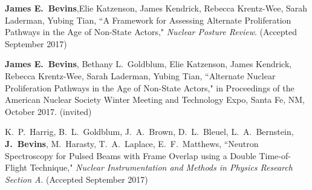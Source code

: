 \begin{bibsection}
  
\item \textbf{James E.\ Bevins},Elie Katzenson, James Kendrick, Rebecca Krentz-Wee, Sarah Laderman, Yubing Tian, ``A Framework for Assessing Alternate Proliferation Pathways in the Age of Non-State Actors," \textit{Nuclear Posture Review}. (Accepted September 2017)

\item \textbf{James E.\ Bevins}, Bethany L.\ Goldblum, Elie Katzenson, James Kendrick, Rebecca Krentz-Wee, Sarah Laderman, Yubing Tian, ``Alternate Nuclear Proliferation Pathways in the Age of Non-State Actors," in Proceedings of the American Nuclear Society Winter Meeting and Technology Expo, Santa Fe, NM, October 2017. (invited)


\item K.\ P.\ Harrig, B.\ L.\ Goldblum, J.\ A.\ Brown, D.\ L.\ Bleuel, L.\ A.\ Bernstein, \textbf{J.\ Bevins}, M.\ Harasty, T.\ A.\ Laplace, E.\ F.\ Matthews, ``Neutron Spectroscopy for Pulsed Beams with Frame Overlap using a Double Time-of-Flight Technique," \textit{Nuclear Instrumentation and Methods in Physics Research Section A}. (Accepted September 2017)
  

  


\end{bibsection}
